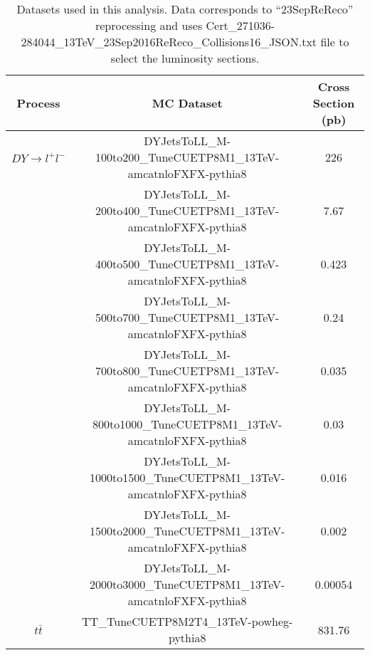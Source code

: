 \documentclass[
10pt, %
a4paper, %
oneside, %
headinclude,footinclude, %
BCOR5mm, %
]{scrartcl}
\begin{document}
\begin{table}[htp]
\centering
\label{tab:datasets}
    \caption{ Datasets used in this analysis. Data corresponds to ``23SepReReco'' reprocessing and uses 
{\small Cert\_271036-284044\_13TeV\_23Sep2016ReReco\_Collisions16\_JSON.txt} file to select the luminosity sections.}
\begin{adjustbox}{width=1\textwidth}
 \begin{tabular}{||c c c ||} 
 \hline
 \textbf{Process} & \textbf{MC Dataset} & \textbf{Cross Section (pb)} \\ [0.5ex] 
 \hline\hline
 $DY \rightarrow l^+ l^-$ & {\small DYJetsToLL\_M-100to200\_TuneCUETP8M1\_13TeV-amcatnloFXFX-pythia8} & 226 \\ 
                          & {\small DYJetsToLL\_M-200to400\_TuneCUETP8M1\_13TeV-amcatnloFXFX-pythia8}   &   7.67   \\  
                          & {\small DYJetsToLL\_M-400to500\_TuneCUETP8M1\_13TeV-amcatnloFXFX-pythia8}    &   0.423  \\
                          & {\small DYJetsToLL\_M-500to700\_TuneCUETP8M1\_13TeV-amcatnloFXFX-pythia8}    &   0.24   \\ 
                          & {\small DYJetsToLL\_M-700to800\_TuneCUETP8M1\_13TeV-amcatnloFXFX-pythia8}    &   0.035 \\ 
                          & {\small DYJetsToLL\_M-800to1000\_TuneCUETP8M1\_13TeV-amcatnloFXFX-pythia8}   &   0.03  \\ 
                          & {\small DYJetsToLL\_M-1000to1500\_TuneCUETP8M1\_13TeV-amcatnloFXFX-pythia8}  &   0.016 \\ 
                          & {\small DYJetsToLL\_M-1500to2000\_TuneCUETP8M1\_13TeV-amcatnloFXFX-pythia8}  &   0.002 \\ 
                          & {\small DYJetsToLL\_M-2000to3000\_TuneCUETP8M1\_13TeV-amcatnloFXFX-pythia8}  &   0.00054\\
 \hline
 $t \bar{t}$ & TT\_TuneCUETP8M2T4\_13TeV-powheg-pythia8  & 831.76\\ [1ex] 
 \hline \hline
\end{tabular}
\end{adjustbox}
\end{table}
\end{document}
